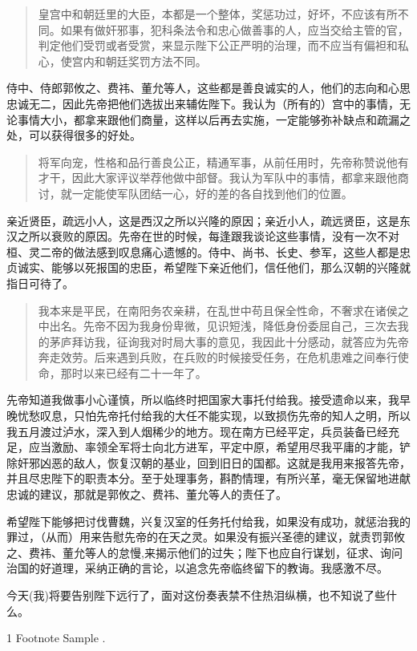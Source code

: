\documentclass[]{ctexart}
\begin{document}
	\begin{quote}皇宫中和朝廷里的大臣，本都是一个整体，奖惩功过，好坏，不应该有所不同。如果有做奸邪事，犯科条法令和忠心做善事的人，应当交给主管的官，判定他们受罚或者受赏，来显示陛下公正严明的治理，而不应当有偏袒和私心，使宫内和朝廷奖罚方法不同。\end{quote}
	
	侍中、侍郎郭攸之、费祎、董允等人，这些都是善良诚实的人，他们的志向和心思忠诚无二，因此先帝把他们选拔出来辅佐陛下。我认为（所有的）宫中的事情，无论事情大小，都拿来跟他们商量，这样以后再去实施，一定能够弥补缺点和疏漏之处，可以获得很多的好处。
	
	\begin{quotation}将军向宠，性格和品行善良公正，精通军事，从前任用时，先帝称赞说他有才干，因此大家评议举荐他做中部督。我认为军队中的事情，都拿来跟他商讨，就一定能使军队团结一心，好的差的各自找到他们的位置。\end{quotation}
	
	亲近贤臣，疏远小人，这是西汉之所以兴隆的原因；亲近小人，疏远贤臣，这是东汉之所以衰败的原因。先帝在世的时候，每逢跟我谈论这些事情，没有一次不对桓、灵二帝的做法感到叹息痛心遗憾的。侍中、尚书、长史、参军，这些人都是忠贞诚实、能够以死报国的忠臣，希望陛下亲近他们，信任他们，那么汉朝的兴隆就指日可待了。
	
	\begin{verse}我本来是平民，在南阳务农亲耕，在乱世中苟且保全性命，不奢求在诸侯之中出名。先帝不因为我身份卑微，见识短浅，降低身份委屈自己，三次去我的茅庐拜访我，征询我对时局大事的意见，我因此十分感动，就答应为先帝奔走效劳。后来遇到兵败，在兵败的时候接受任务，在危机患难之间奉行使命，那时以来已经有二十一年了。\end{verse}
	
	先帝知道我做事小心谨慎，所以临终时把国家大事托付给我。接受遗命以来，我早晚忧愁叹息，只怕先帝托付给我的大任不能实现，以致损伤先帝的知人之明，所以我五月渡过泸水，深入到人烟稀少的地方。现在南方已经平定，兵员装备已经充足，应当激励、率领全军将士向北方进军，平定中原，希望用尽我平庸的才能，铲除奸邪凶恶的敌人，恢复汉朝的基业，回到旧日的国都。这就是我用来报答先帝，并且尽忠陛下的职责本分。至于处理事务，斟酌情理，有所兴革，毫无保留地进献忠诚的建议，那就是郭攸之、费祎、董允等人的责任了。
	
	希望陛下能够把讨伐曹魏，兴复汉室的任务托付给我，如果没有成功，就惩治我的罪过，（从而）用来告慰先帝的在天之灵。如果没有振兴圣德的建议，就责罚郭攸之、费祎、董允等人的怠慢,来揭示他们的过失；陛下也应自行谋划，征求、询问治国的好道理，采纳正确的言论，以追念先帝临终留下的教诲。我感激不尽。
	
	今天(我)将要告别陛下远行了，面对这份奏表禁不住热泪纵横，也不知说了些什么。\\
	
	\begin{minipage}{\linewidth}
		\begin{tabular}{1}
			Footnote Sample \footnotemark.
		\end{tabular}
	\end{minipage}
	
\end{document}
